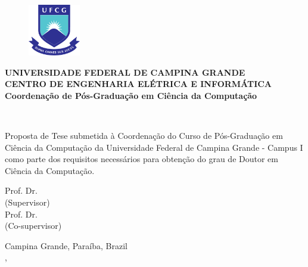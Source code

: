 \begin{figure}[H]
\centering
\includegraphics[height=85px]{images/logo_ufcg.png}
\end{figure}

\begin{center}
\textbf{UNIVERSIDADE FEDERAL DE CAMPINA GRANDE} \\
\textbf{CENTRO DE ENGENHARIA ELÉTRICA E INFORMÁTICA} \\
\textbf{Coordenação de Pós-Graduação em Ciência da Computação}
\vspace{3em}

\Large{}
\thetitle
\vspace{3em}

\Large{\theauthor}\\
\vspace{2em}

\normalsize{\parbox[t]{122mm}{Proposta de Tese submetida à Coordenação do Curso de Pós-Graduação em Ciência da Computação da Universidade Federal de Campina Grande - Campus I como parte dos requisitos necessários para obtenção do grau de Doutor em Ciência da Computação.}}
\vspace{6em}


Prof. Dr. \profa\\
(Supervisor) \\
\vspace{1em}
Prof. Dr. \profb\\
(Co-supervisor)
\vfill

Campina Grande, Paraíba, Brazil \\
\MONTH, \the\year
\end{center}